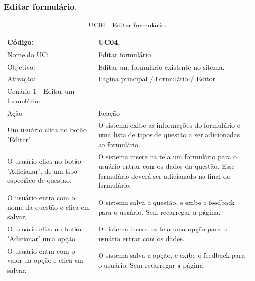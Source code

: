 \documentclass[11pt]{article}
\begin{document}
    \clearpage
      
      \subsubsection{Editar formulário.}

        \begin{table}[h]
          \begin{center}
            \begin{tabular}{ | p{7cm} | p{8cm} | }
              \hline
              Código: \cellcolor{gray} & UC04. \\
              \hline
              Nome do UC: \cellcolor{gray} & Editar formulário. \\
              \hline
              Objetivo: \cellcolor{gray} & Editar um formulário existente no sitema. \\
              \hline
              Ativação: \cellcolor{gray} & Página principal / Formulário / Editor \\
              \hline
              \hline
              Cenário 1 - Editar um formulário: &  \\
              \hline
              Ação\cellcolor{gray} & Reação\cellcolor{gray} \\
              \hline
              Um usuário clica no botão 'Editor' & O sistema exibe as informações do formulário e uma lista de tipos de questão a ser adicionadas ao formulário. \\
              \hline
              O usuário clica no botão 'Adicionar', de um tipo específico de questão. & O sistema insere na tela um formulário para o usuário entrar com os dados da questão. Esse formulário deverá ser adicionado no final do formulário. \\
              \hline
              O usuário entra com o nome da questão e clica em salvar. & O sistema salva a questão, e exibe o feedback para o usuário. Sem recarregar a página. \\
              \hline
              O usuário clica no botão 'Adicionar' uma opção. & O sistema insere na tela uma opção para o usuário entrar com os dados. \\
              \hline
              O usuário entra com o valor da opção e clica em salvar. & O sistema salva a opção, e exibe o feedback para o usuário. Sem recarregar a página. \\
              \hline
            \end{tabular}
            \caption{UC04 - Editar formulário.}
          \end{center}
        \end{table}
        
\end{document}
